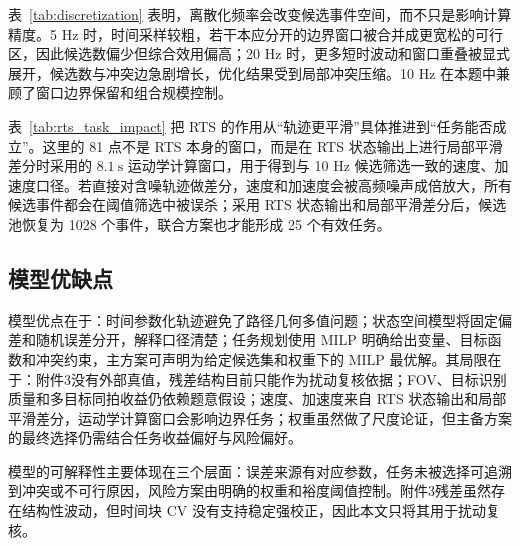 \documentclass{cumcmthesis}
\begin{document}
表~\ref{tab:discretization} 表明，离散化频率会改变候选事件空间，而不只是影响计算精度。5 Hz 时，时间采样较粗，若干本应分开的边界窗口被合并成更宽松的可行区，因此候选数偏少但综合效用偏高；20 Hz 时，更多短时波动和窗口重叠被显式展开，候选数与冲突边急剧增长，优化结果受到局部冲突压缩。10 Hz 在本题中兼顾了窗口边界保留和组合规模控制。

\begin{table}[H]
  \centering
  \caption{平滑运动学输入对问题四候选事件的影响}
  \label{tab:rts_task_impact}
  \small
\end{table}

表~\ref{tab:rts_task_impact} 把 RTS 的作用从“轨迹更平滑”具体推进到“任务能否成立”。这里的 81 点不是 RTS 本身的窗口，而是在 RTS 状态输出上进行局部平滑差分时采用的 $8.1\ \mathrm{s}$ 运动学计算窗口，用于得到与 10 Hz 候选筛选一致的速度、加速度口径。若直接对含噪轨迹做差分，速度和加速度会被高频噪声成倍放大，所有候选事件都会在阈值筛选中被误杀；采用 RTS 状态输出和局部平滑差分后，候选池恢复为 1028 个事件，联合方案也才能形成 25 个有效任务。

\subsection{模型优缺点}
模型优点在于：时间参数化轨迹避免了路径几何多值问题；状态空间模型将固定偏差和随机误差分开，解释口径清楚；任务规划使用 MILP 明确给出变量、目标函数和冲突约束，主方案可声明为给定候选集和权重下的 MILP 最优解。其局限在于：附件3没有外部真值，残差结构目前只能作为扰动复核依据；FOV、目标识别质量和多目标同拍收益仍依赖题意假设；速度、加速度来自 RTS 状态输出和局部平滑差分，运动学计算窗口会影响边界任务；权重虽然做了尺度论证，但主备方案的最终选择仍需结合任务收益偏好与风险偏好。

模型的可解释性主要体现在三个层面：误差来源有对应参数，任务未被选择可追溯到冲突或不可行原因，风险方案由明确的权重和裕度阈值控制。附件3残差虽然存在结构性波动，但时间块 CV 没有支持稳定强校正，因此本文只将其用于扰动复核。
\end{document}
